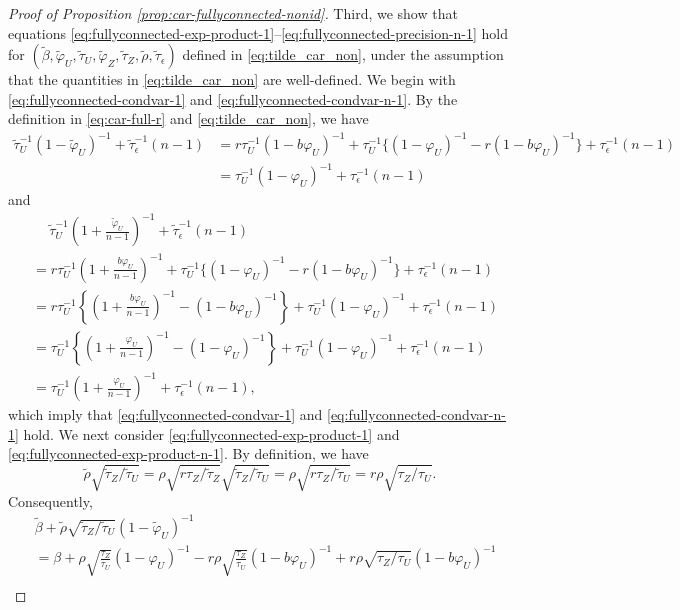 \documentclass[11pt]{article}
\theoremstyle{definition}
\theoremstyle{remark}
\begin{document}
\begin{proof}[Proof of Proposition \ref{prop:car-fullyconnected-nonid}]
Third, we show that equations \eqref{eq:fullyconnected-exp-product-1}--\eqref{eq:fullyconnected-precision-n-1} hold for $(\tilde\beta, \tilde\varphi_U, \tilde\tau_U, \tilde\varphi_Z, \tilde\tau_Z, \tilde\rho, \tilde\tau_\epsilon)$ defined in \eqref{eq:tilde_car_non}, under the assumption that the quantities in \eqref{eq:tilde_car_non} are well-defined. 
We begin with \eqref{eq:fullyconnected-condvar-1} and \eqref{eq:fullyconnected-condvar-n-1}. 
By the definition in \eqref{eq:car-full-r} and \eqref{eq:tilde_car_non}, we have 
\begin{align*}
\tilde\tau_U^{-1}(1-\tilde\varphi_U)^{-1} + \tilde\tau_\epsilon^{-1}(n-1) &= r \tau_U^{-1}(1-b\varphi_U)^{-1} + \tau_U^{-1}\{(1-\varphi_U)^{-1} - r(1-b\varphi_U)^{-1}\} + \tau_\epsilon^{-1}(n-1)
\\
&= \tau_U^{-1}(1-\varphi_U)^{-1} + \tau_\epsilon^{-1}(n-1)
\end{align*} and 
\begin{align*}
& \quad \ \tilde\tau_U^{-1}\left(1+\frac{\tilde\varphi_U}{n-1}\right)^{-1} + \tilde\tau_\epsilon^{-1}(n-1)
\\ 
&= r \tau_U^{-1}\left(1+\frac{b\varphi_U}{n-1}\right)^{-1} + \tau_U^{-1}\{(1-\varphi_U)^{-1} - r(1-b\varphi_U)^{-1}\} + \tau_\epsilon^{-1}(n-1) \\
&= r\tau_U^{-1}\left\{\left(1+\frac{b\varphi_U}{n-1}\right)^{-1} - (1-b\varphi_U)^{-1}\right\} + \tau_U^{-1}(1-\varphi_U)^{-1} + \tau_\epsilon^{-1}(n-1) \\
&= \tau_U^{-1}\left\{\left(1 + \frac{\varphi_U}{n-1} \right)^{-1} - \left(1-\varphi_U\right)^{-1}\right\}+ \tau_U^{-1}(1-\varphi_U)^{-1} + \tau_\epsilon^{-1}(n-1) \\
&= \tau_U^{-1}\left(1+\frac{\varphi_U}{n-1}\right)^{-1} + \tau_\epsilon^{-1} (n-1),
\end{align*} 
which imply that \eqref{eq:fullyconnected-condvar-1} and \eqref{eq:fullyconnected-condvar-n-1} hold. We next consider \eqref{eq:fullyconnected-exp-product-1} and \eqref{eq:fullyconnected-exp-product-n-1}. 
By definition, we have  \begin{equation}\nonumber%
\tilde\rho\sqrt{\tilde\tau_Z/\tilde\tau_U}=
 \rho\sqrt{r \tau_Z/\tilde\tau_Z} \sqrt{\tilde\tau_Z/\tilde\tau_U}
=
\rho\sqrt{r \tau_Z/\tilde\tau_U}
= 
r\rho\sqrt{\tau_Z/\tau_U}.
\end{equation} 
Consequently, 
\begin{align*}
&\tilde\beta + \tilde\rho\sqrt{\tilde\tau_Z/\tilde\tau_U}(1-\tilde\varphi_U)^{-1}\\ &=  \beta + \rho\sqrt{\frac{\tau_Z}{\tau_U}}(1-\varphi_U)^{-1} - r\rho\sqrt{\frac{\tau_Z}{\tau_U}}(1-b\varphi_U)^{-1} + r\rho\sqrt{\tau_Z/\tau_U}(1-b\varphi_U)^{-1} \\

\end{align*}
\end{proof}
\end{document}
